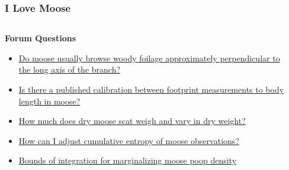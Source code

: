 \documentclass[compress, aspectratio=169]{beamer}
\begin{document}
\begin{frame}
	\frametitle{I Love Moose}
	\begin{columns}
	\begin{column}{0.4\textwidth}
	\centering
	\tiny
	\textbf{Forum Questions}
	\begin{itemize}
		\item \href{https://biology.stackexchange.com/questions/108913/do-moose-usually-browse-woody-foilage-approximately-perpendicular-to-the-long-ax}{Do moose usually browse woody foilage approximately perpendicular to the long axis of the branch?}
		\item \href{https://biology.stackexchange.com/questions/107971/is-there-a-published-calibration-between-footprint-measurements-to-body-length-i}{Is there a published calibration between footprint measurements to body length in moose?}
		\item \href{https://biology.stackexchange.com/questions/107876/how-much-does-dry-moose-scat-weigh-and-vary-in-dry-weight}{How much does dry moose scat weigh and vary in dry weight?}
		\item \href{https://stats.stackexchange.com/questions/575245/how-can-i-adjust-cumulative-entropy-of-moose-observations}{How can I adjust cumulative entropy of moose observations?}
		\item \href{https://stats.stackexchange.com/questions/575100/bounds-of-integration-for-marginalizing-moose-poop-density}{Bounds of integration for marginalizing moose poop density}
	\end{itemize}
	\end{column}
	\begin{column}{0.6\textwidth}
	\begin{tabular}{cc}

\end{tabular}
\end{column}
\end{columns}
\end{frame}
\end{document}
